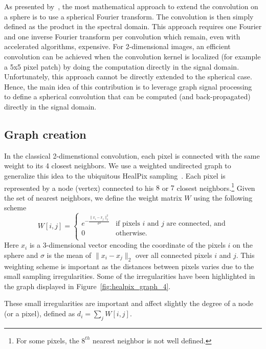 \documentclass[final,twocolumn,3p,times,authoryear]{elsarticle}
\newcommand{\figref}[1]{Figure~\ref{fig:#1}}
\newcommand{\1}{\b{1}}              %
\newcommand{\0}{\b{0}}              %
\begin{document}
As presented by~\cite{cohen2018spherical}, the most mathematical approach to
extend the convolution on a sphere is to use a spherical Fourier transform. The
convolution is then simply defined as the product in the spectral domain. This
approach requires one Fourier and one inverse Fourier transform per convolution
which remain, even with accelerated algorithms, expensive. For 2-dimensional
images, an efficient convolution can be achieved when the convolution kernel is
localized (for example a 5x5 pixel patch) by doing the computation directly in
the signal domain. Unfortunately, this approach cannot be directly extended to
the spherical case. Hence, the main idea of this contribution is to leverage
graph signal processing~\cite{shuman2013emerging} to define a spherical
convolution that can be computed (and back-propagated) directly in the signal domain.

\subsection{Graph creation}
In the classical 2-dimenstional convolution, each pixel is connected with the
same weight to its 4 closest neighbors. We use a weighted undirected graph to
generalize this idea to the ubiquitous HealPix
sampling~\citep{gorski2005healpix}.  Each pixel is represented by a node
(vertex) connected to his $8$ or $7$ closest neighbors.\footnote{For some
pixels, the $8^{th}$ nearest neighbor is not well defined.} Given the set of
nearest neighbors, we define the weight matrix $W$ using the following scheme
\begin{equation}
W[i,j]=\begin{cases}
e^{-\frac{\|x_i-x_j\|_2^2}{\sigma^2}} & \text{if pixels $i$ and $j$ are connected, and}\\
0 & \text{otherwise.}\\
\end{cases}
\end{equation}
Here $x_i$ is a 3-dimensional vector encoding the coordinate of the pixels $i$
on the sphere and $\sigma$ is the mean of $\|x_i-x_j\|_2$ over all connected
pixels $i$ and $j$. This weighting scheme is important as the distances between
pixels varies due to the small sampling irregularities. Some of the
irregularities have been highlighted in the graph displayed in
\figref{healpix_graph_4}.

These small irregularities are important and affect slightly the degree of a
node (or a pixel), defined as $d_i =\sum_j W[i,j]$.
\end{document}

